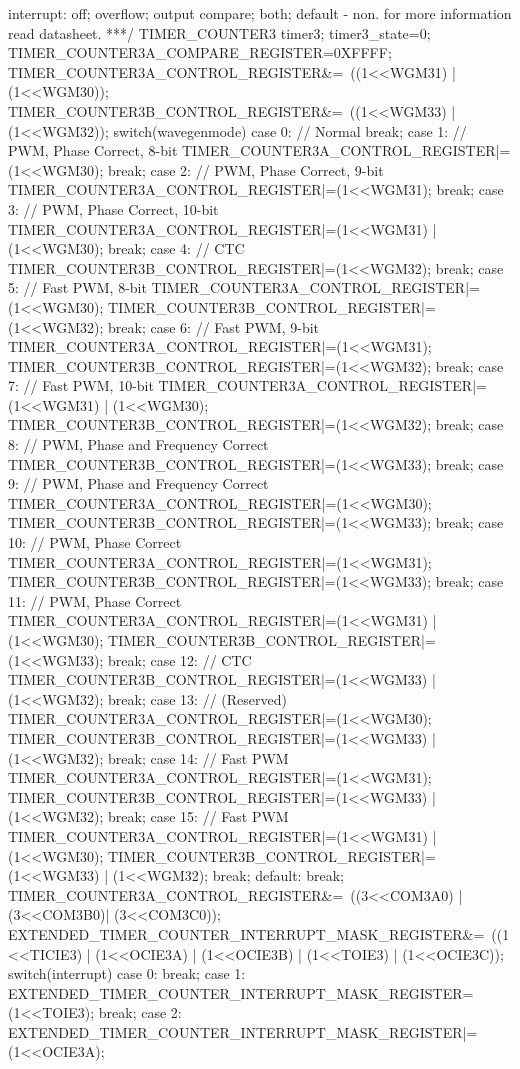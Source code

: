 \begin{verbatimtab}
interrupt: off; overflow; output compare; both; default - non.
for more information read datasheet.
***/
{
	TIMER_COUNTER3 timer3;
	timer3_state=0;
	TIMER_COUNTER3A_COMPARE_REGISTER=0XFFFF;
	TIMER_COUNTER3A_CONTROL_REGISTER&=~((1<<WGM31) | (1<<WGM30));
	TIMER_COUNTER3B_CONTROL_REGISTER&=~((1<<WGM33) | (1<<WGM32));
	switch(wavegenmode){
		case 0: // Normal
		break;
		case 1: // PWM, Phase Correct, 8-bit
		TIMER_COUNTER3A_CONTROL_REGISTER|=(1<<WGM30);
		break;
		case 2:	// PWM, Phase Correct, 9-bit
		TIMER_COUNTER3A_CONTROL_REGISTER|=(1<<WGM31);
		break;
		case 3:	// PWM, Phase Correct, 10-bit
		TIMER_COUNTER3A_CONTROL_REGISTER|=(1<<WGM31) | (1<<WGM30);
		break;
		case 4:	// CTC
		TIMER_COUNTER3B_CONTROL_REGISTER|=(1<<WGM32);
		break;
		case 5:	// Fast PWM, 8-bit
		TIMER_COUNTER3A_CONTROL_REGISTER|=(1<<WGM30);
		TIMER_COUNTER3B_CONTROL_REGISTER|=(1<<WGM32);
		break;
		case 6:	// Fast PWM, 9-bit
		TIMER_COUNTER3A_CONTROL_REGISTER|=(1<<WGM31);
		TIMER_COUNTER3B_CONTROL_REGISTER|=(1<<WGM32);
		break;
		case 7:	// Fast PWM, 10-bit
		TIMER_COUNTER3A_CONTROL_REGISTER|=(1<<WGM31) | (1<<WGM30);
		TIMER_COUNTER3B_CONTROL_REGISTER|=(1<<WGM32);
		break;
		case 8:	// PWM, Phase and Frequency Correct
		TIMER_COUNTER3B_CONTROL_REGISTER|=(1<<WGM33);
		break;
		case 9:	// PWM, Phase and Frequency Correct
		TIMER_COUNTER3A_CONTROL_REGISTER|=(1<<WGM30);
		TIMER_COUNTER3B_CONTROL_REGISTER|=(1<<WGM33);
		break;
		case 10: // PWM, Phase Correct
		TIMER_COUNTER3A_CONTROL_REGISTER|=(1<<WGM31);
		TIMER_COUNTER3B_CONTROL_REGISTER|=(1<<WGM33);
		break;
		case 11: // PWM, Phase Correct
		TIMER_COUNTER3A_CONTROL_REGISTER|=(1<<WGM31) | (1<<WGM30);
		TIMER_COUNTER3B_CONTROL_REGISTER|=(1<<WGM33);
		break;
		case 12: // CTC
		TIMER_COUNTER3B_CONTROL_REGISTER|=(1<<WGM33) | (1<<WGM32);
		break;
		case 13: // (Reserved)
		TIMER_COUNTER3A_CONTROL_REGISTER|=(1<<WGM30);
		TIMER_COUNTER3B_CONTROL_REGISTER|=(1<<WGM33) | (1<<WGM32);
		break;
		case 14: // Fast PWM
		TIMER_COUNTER3A_CONTROL_REGISTER|=(1<<WGM31);
		TIMER_COUNTER3B_CONTROL_REGISTER|=(1<<WGM33) | (1<<WGM32);
		break;
		case 15: // Fast PWM
		TIMER_COUNTER3A_CONTROL_REGISTER|=(1<<WGM31) | (1<<WGM30);
		TIMER_COUNTER3B_CONTROL_REGISTER|=(1<<WGM33) | (1<<WGM32);
		break;
		default:
		break;
	}
	TIMER_COUNTER3A_CONTROL_REGISTER&=~((3<<COM3A0) | (3<<COM3B0)| (3<<COM3C0));
	EXTENDED_TIMER_COUNTER_INTERRUPT_MASK_REGISTER&=~((1<<TICIE3) |
	(1<<OCIE3A) | (1<<OCIE3B) | (1<<TOIE3) | (1<<OCIE3C));
	switch(interrupt){
		case 0:
		break;
		case 1:
		EXTENDED_TIMER_COUNTER_INTERRUPT_MASK_REGISTER=(1<<TOIE3);
		break;
		case 2:
		EXTENDED_TIMER_COUNTER_INTERRUPT_MASK_REGISTER|=(1<<OCIE3A);
}}
\end{verbatimtab}
